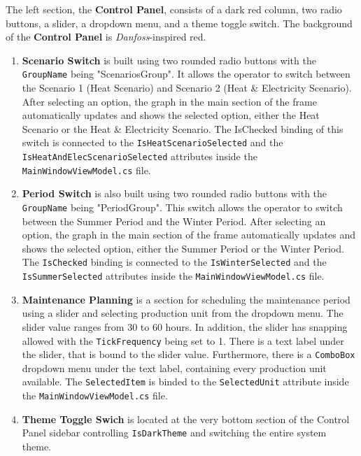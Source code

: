The left section, the \textbf{Control Panel}, consists of a dark red column, two radio buttons, a slider, a dropdown menu, and a theme toggle switch. The background of the \textbf{Control Panel} is  \textit{Danfoss}-inspired red.
\begin{enumerate}
    \item \textbf{Scenario Switch} is built using two rounded radio buttons with the \texttt{GroupName} being "ScenariosGroup". It allows the operator to switch between the Scenario 1 (Heat Scenario)
    and Scenario 2 (Heat \& Electricity Scenario). After selecting an option, the graph in the main section of the frame automatically updates and shows the selected option, either the Heat Scenario
    or the Heat \& Electricity Scenario. The IsChecked binding of this switch is connected to the \texttt{IsHeatScenarioSelected} and the \texttt{IsHeatAndElecScenarioSelected} attributes inside the
    \texttt{MainWindowViewModel.cs} file.
    \item \textbf{Period Switch} is also built using two rounded radio buttons with the \texttt{GroupName} being "PeriodGroup". This switch allows the operator to switch between the Summer Period and the Winter Period. After selecting an option, the graph in the main section of the frame automatically updates and shows the selected option, either the Summer Period or the Winter Period. The \texttt{IsChecked} binding is connected to the \texttt{IsWinterSelected} and the \texttt{IsSummerSelected} attributes inside the \texttt{MainWindowViewModel.cs} file. \item \textbf{Maintenance Planning} is a section for scheduling the maintenance period using a slider and selecting production unit from the dropdown menu. The slider value ranges from 30 to 60 hours. In addition, the slider has snapping allowed with the \texttt{TickFrequency} being set to 1. There is a text label under the slider, that is bound to the slider value. Furthermore, there is a \texttt{ComboBox} dropdown menu under the text label, containing every production unit available. The \texttt{SelectedItem} is binded to the \texttt{SelectedUnit} attribute inside the \texttt{MainWindowViewModel.cs} file.
    \item \textbf{Theme Toggle Swich} is located at the very bottom section of the Control Panel sidebar controlling \texttt{IsDarkTheme} and switching the entire system theme.
\end{enumerate}


